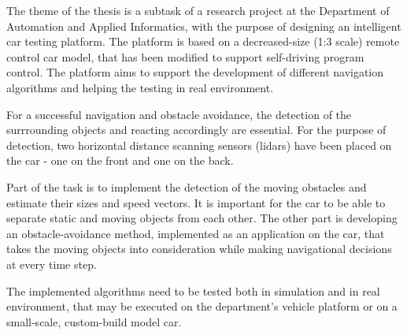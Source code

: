 The theme of the thesis is a subtask of a research project at the Department of Automation and Applied Informatics, with the purpose of designing an intelligent car testing platform. The platform is based on a decreased-size (1:3 scale) remote control car model, that has been modified to support self-driving program control. The platform aims to support the development of different navigation algorithms and helping the testing in real environment.

For a successful navigation and obstacle avoidance, the detection of the surrrounding objects and reacting accordingly are essential. For the purpose of detection, two horizontal distance scanning sensors (lidars) have been placed on the car - one on the front and one on the back.

Part of the task is to implement the detection of the moving obstacles and estimate their sizes and speed vectors. It is important for the car to be able to separate static and moving objects from each other. The other part is developing an obstacle-avoidance method, implemented as an application on the car, that takes the moving objects into consideration while making navigational decisions at every time step.

The implemented algorithms need to be tested both in simulation and in real environment, that may be executed on  the department's vehicle platform or on a small-scale, custom-build model car.

\vfill
\selectthesislanguage

\setcounter{romanPage}{\value{page}}
